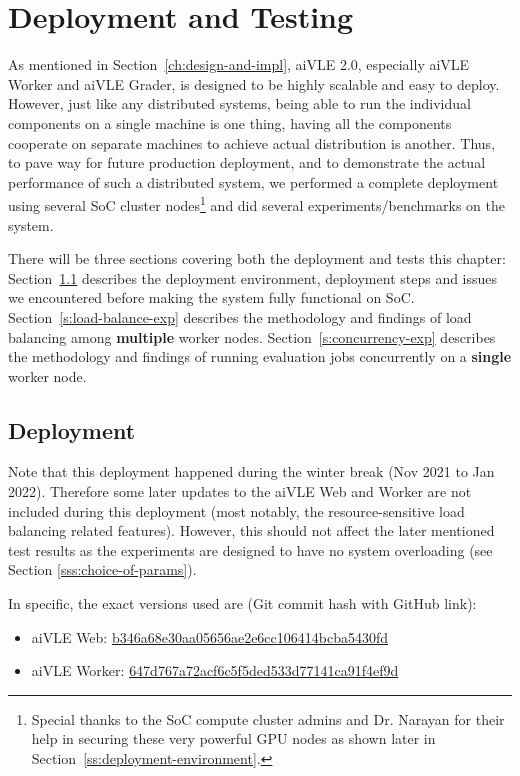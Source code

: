 \chapter{Deployment and Testing}
\label{ch:deployment-and-testing}
As mentioned in Section~\ref{ch:design-and-impl}, aiVLE 2.0, especially aiVLE Worker and aiVLE Grader, is designed to be highly scalable and easy to deploy. However, just like any distributed systems, being able to run the individual components on a single machine is one thing, having all the components cooperate on separate machines to achieve actual distribution is another. Thus, to pave way for future production deployment, and to demonstrate the actual performance of such a distributed system, we performed a complete deployment using several SoC cluster nodes\footnote{Special thanks to the SoC compute cluster admins and Dr. Narayan for their help in securing these very powerful GPU nodes as shown later in Section~\ref{ss:deployment-environment}.} and did several experiments/benchmarks on the system.

There will be three sections covering both the deployment and tests this chapter: Section~\ref{s:deployment} describes the deployment environment, deployment steps and issues we encountered before making the system fully functional on SoC. Section~\ref{s:load-balance-exp} describes the methodology and findings of load balancing among \textbf{multiple} worker nodes. Section~\ref{s:concurrency-exp} describes the methodology and findings of running evaluation jobs concurrently on a \textbf{single} worker node.

\section{Deployment}
\label{s:deployment}
Note that this deployment happened during the winter break (Nov 2021 to Jan 2022). Therefore some later updates to the aiVLE Web and Worker are not included during this deployment (most notably, the resource-sensitive load balancing related features). However, this should not affect the later mentioned test results as the experiments are designed to have no system overloading (see Section \ref{sss:choice-of-params}).

In specific, the exact versions used are (Git commit hash with GitHub link):
\begin{itemize}
    \item aiVLE Web: \href{https://github.com/edu-ai/aivle-web/commit/b346a68e30aa05656ae2e6cc106414bcba5430fd}{b346a68e30aa05656ae2e6cc106414bcba5430fd}
    \item aiVLE Worker: \href{https://github.com/edu-ai/aivle-worker/commit/647d767a72acf6c5f5ded533d77141ca91f4ef9d}{647d767a72acf6c5f5ded533d77141ca91f4ef9d}
\end{itemize}

